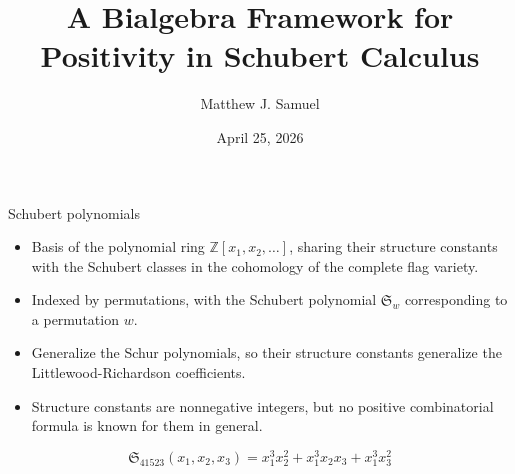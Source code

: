 \documentclass[aspectratio=169]{beamer}
\title[A Bialgebra Framework for Schubert Calculus]{A Bialgebra Framework for Positivity in Schubert Calculus}
\author{Matthew J. Samuel}
\institute{CombinaTexas 2026}
\date{April 25, 2026}
\newcommand{\sch}{\mathfrak{S}}
\begin{document}
\begin{frame}
  \titlepage
\end{frame}

\begin{frame}{Schubert polynomials}
\begin{itemize}
  \item Basis of the polynomial ring $\mathbb{Z}[x_1,x_2,\ldots]$, sharing their structure constants with the Schubert classes in the cohomology of the complete flag variety.
  \item Indexed by permutations, with the Schubert polynomial $\sch_w$ corresponding to a permutation $w$.
  \item Generalize the Schur polynomials, so their structure constants generalize the Littlewood-Richardson coefficients.
  \item Structure constants are nonnegative integers, but no positive combinatorial formula is known for them in general.
\end{itemize}
$$\sch_{41523}(x_1,x_2,x_3) = x_{1}^{3} x_{2}^{2} + x_{1}^{3} x_{2} x_{3} + x_{1}^{3} x_{3}^{2}$$
\end{frame}

  

\end{document}
